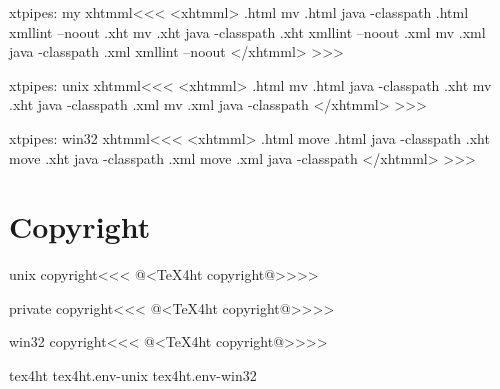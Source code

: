 \documentclass{article}
\begin{document}
\<xtpipes: my xhtmml\><<<
<xhtmml>
.html mv %
.html java -classpath %
.html xmllint --noout %
.xht mv %
.xht java -classpath %
.xht xmllint --noout %
.xml mv %
.xml java -classpath %
.xml xmllint --noout %
</xhtmml>
>>>


\<xtpipes: unix xhtmml\><<<
<xhtmml>
.html mv %
.html java -classpath  %
.xht mv %
.xht java -classpath  %
.xml mv %
.xml java -classpath  %
</xhtmml>
>>>


\<xtpipes: win32 xhtmml\><<<
<xhtmml>
.html move %
.html java -classpath  %
.xht move %
.xht java -classpath  %
.xml move %
.xml java -classpath  %
</xhtmml>
>>>





\section{Copyright}




\<unix copyright\><<<
@<TeX4ht copyright@>>>>

\<private copyright\><<<
@<TeX4ht copyright@>>>>

\<win32 copyright\><<<
@<TeX4ht copyright@>>>>


\OutputCode\<tex4ht\>
\OutputCodE\<tex4ht.env-unix\>
\OutputCodE\<tex4ht.env-win32\>
\end{document}
